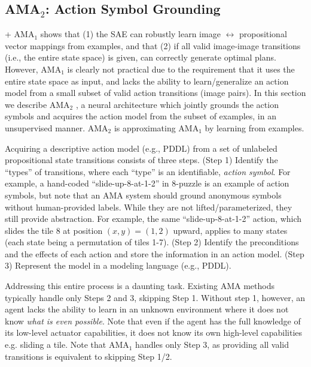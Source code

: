\documentclass[10pt,letterpaper]{article}
\begin{document}
\subsection{AMA$_2$: Action Symbol Grounding}
\label{sec:ama2-overview}

\latentplanner + AMA$_1$ shows that (1) the SAE can robustly learn image
$\leftrightarrow$ propositional vector mappings from examples, and that
(2) if all valid image-image transitions (i.e., the entire state space)
is given, \latentplanner can correctly generate optimal plans.  However,
AMA$_1$ is clearly not practical due to the requirement that it uses the
entire state space as input, and lacks the ability to learn/generalize
an action model from a small subset of valid action transitions (image
pairs).  In this section we describe AMA$_2$ \cite{Asai2018}, a neural
architecture which jointly grounds the action symbols and acquires the
action model from the subset of examples, in an unsupervised manner.
AMA$_2$ is approximating AMA$_1$ by learning from examples.

Acquiring a descriptive action model (e.g., PDDL) from a set of unlabeled propositional state transitions consists of three steps.
% 
(Step 1) Identify the ``types'' of transitions, where each ``type'' is an identifiable, \emph{action symbol}.
For example, a  hand-coded ``slide-up-8-at-1-2'' in 8-puzzle is an example of action symbols, but note that an AMA system should ground anonymous symbols without human-provided labels.
% 
While they are not lifted/parameterized, they still provide abstraction. For example, the same ``slide-up-8-at-1-2'' action, which slides the tile 8 at position $(x,y)=(1,2)$ upward, applies to many states (each state being a permutation of tiles 1-7).
% 
(Step 2) Identify the preconditions and the effects of each action and store the information in an action model.
(Step 3) Represent the model in a modeling language (e.g., PDDL).

Addressing this entire process is a daunting task. 
Existing AMA methods typically handle only Steps 2 and 3, skipping Step 1.
Without step 1, however, an agent lacks the ability to learn in an unknown environment where it does not know \emph{what is even possible}.
Note that even if the agent has the full knowledge of its low-level actuator capabilities, it does not know its own high-level capabilities e.g. sliding a tile.
Note that AMA$_1$ handles only Step 3, as providing all valid transitions is equivalent to skipping Step 1/2.
\end{document}
